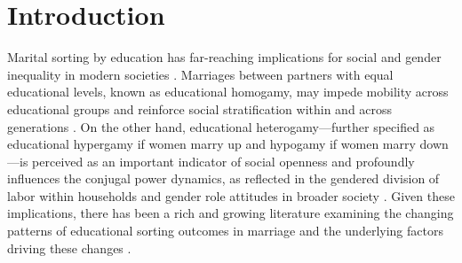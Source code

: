 \section{Introduction}
\label{sec:ch4-introduction}

Marital sorting by education has far-reaching implications for social and gender inequality in modern societies \parencite{blossfeldEducationalAssortativeMarriage2009,blossfeldWhoMarriesWhom2003,schwartzTrendsVariationAssortative2013}. Marriages between partners with equal educational levels, known as educational homogamy, may impede mobility across educational groups and reinforce social stratification within and across generations \parencite{kalmijnStatusHomogamyUnited1991,kalmijnIntermarriageHomogamyCauses1998,mareFiveDecadesEducational1991,smitsEducationalHomogamy651998}. On the other hand, educational heterogamy—further specified as educational hypergamy if women marry up and hypogamy if women marry down—is perceived as an important indicator of social openness and profoundly influences the conjugal power dynamics, as reflected in the gendered division of labor within households and gender role attitudes in broader society \parencite{bakerMarriageSpecializationGender2007,dribeEducationalHomogamyGenderSpecific2013,eeckhautEducationalHeterogamyDivision2014,eikaEducationalAssortativeMating2019,vanbavelEducationalPairingsMotherhood2017}. Given these implications, there has been a rich and growing literature examining the changing patterns of educational sorting outcomes in marriage and the underlying factors driving these changes \parencite{eratEducationalAssortativeMating2021,esteveGenderGapReversalEducation2012,esteveEndHypergamyGlobal2016,hirschlEightDecadesEducational2024,leeschDecomposingTrendsEducational2023,leeschStructuralOpportunitiesAssortative2024}.

